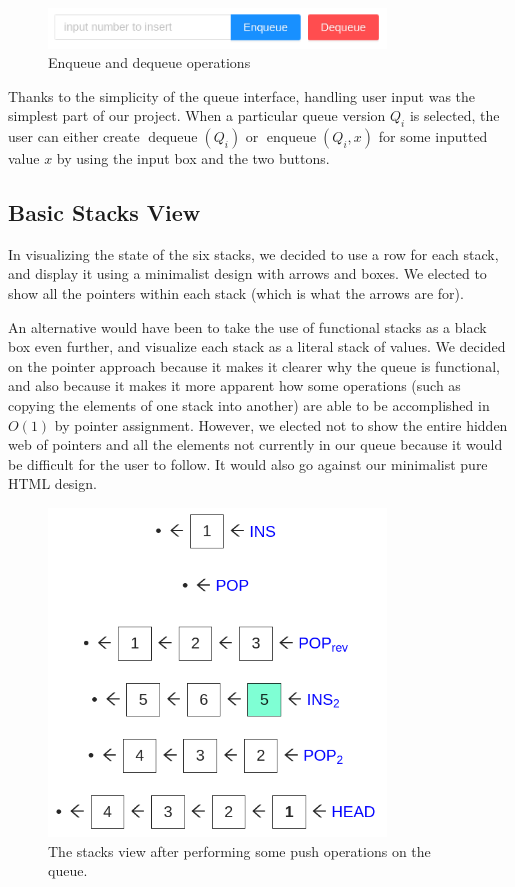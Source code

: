 \documentclass[runningheads]{llncs}
\DeclareMathOperator{\dequeue}{dequeue}
\DeclareMathOperator{\enqueue}{enqueue}
\begin{document}
\begin{figure}[H]
    \centering
    \includegraphics[width=0.8\textwidth]{input.png}
    \caption{Enqueue and dequeue operations}
\end{figure}

Thanks to the simplicity of the queue interface, handling user input was the simplest part of our project. When a particular queue version $Q_i$ is selected, the user can either create $\dequeue(Q_i)$ or $\enqueue(Q_i, x)$ for some inputted value $x$ by using the input box and the two buttons.

\subsection{Basic Stacks View}

In visualizing the state of the six stacks, we decided to use a row for each stack, and display it using a minimalist design with arrows and boxes. We elected to show all the pointers within each stack (which is what the arrows are for). 

An alternative would have been to take the use of functional stacks as a black box even further, and visualize each stack as a literal stack of values. We decided on the pointer approach because it makes it clearer why the queue is functional, and also because it makes it more apparent how some operations (such as copying the elements of one stack into another) are able to be accomplished in $O(1)$ by pointer assignment. However, we elected not to show the entire hidden web of pointers and all the elements not currently in our queue because it would be difficult for the user to follow. It would also go against our minimalist pure HTML design.

\begin{figure}[H]
    \centering
    \includegraphics[width=0.8\textwidth]{stacks.png}
    \caption{The stacks view after performing some push operations on the queue.}
\end{figure}
\end{document}
